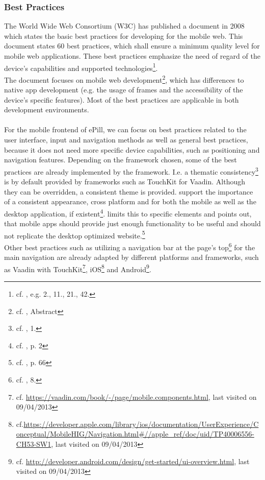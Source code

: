 \subsubsection{Best Practices}
\label{subsec:BestPractices}
The World Wide Web Consortium (W3C) has published a document in 2008 which states the basic best practices for developing for the mobile web. This document states 60 best practices, which shall ensure a minimum quality level for mobile web applications. These best practices emphasize the need of regard of the device's capabilities and supported technologies\footnote{cf. \cite{WorldWideWebConsortium.2008}, e.g. 2., 11., 21., 42.}. 
\\
The document focuses on mobile web development\footnote{cf. \cite{WorldWideWebConsortium.2008}, Abstract}, which has differences to native app development (e.g. the usage of frames and the accessibility of the device's specific features). Most of the best practices are applicable in both development environments.
\\
\\
For the mobile frontend of ePill, we can focus on best practices related to the user interface, input and navigation methods as well as general best practices, because it does not need more specific device capabilities, such as positioning and navigation features. Depending on the framework chosen, some of the best practices are already implemented by the framework. I.e. a thematic consistency\footnote{cf. \cite{WorldWideWebConsortium.2008}, 1.} is by default provided by frameworks such as TouchKit for Vaadin. Although they can be overridden, a consistent theme is provided. \cite{Wessels.2011} support the importance of a consistent appearance, cross platform and for both the mobile as well as the desktop application, if existent\footnote{cf. \cite{Wessels.2011}, p. 2}. \cite{Lica.2010} limits this to specific elements and points out, that mobile apps should provide just enough functionality to be useful and should not replicate the desktop optimized website.\footnote{cf. \cite{Lica.2010}, p. 66}
\\
Other best practices such as utilizing a navigation bar at the page's top\footnote{cf. \cite{WorldWideWebConsortium.2008}, 8.} for the main navigation are already adapted by different platforms and frameworks, such as Vaadin with TouchKit\footnote{cf. \url{https://vaadin.com/book/-/page/mobile.components.html}, last visited on 09/04/2013}, iOS\footnote{cf.\url{https://developer.apple.com/library/ios/documentation/UserExperience/Conceptual/MobileHIG/Navigation.html\#//apple_ref/doc/uid/TP40006556-CH53-SW1}, last visited on 09/04/2013} and Android\footnote{cf. \url{http://developer.android.com/design/get-started/ui-overview.html}, last visited on 09/04/2013}.
